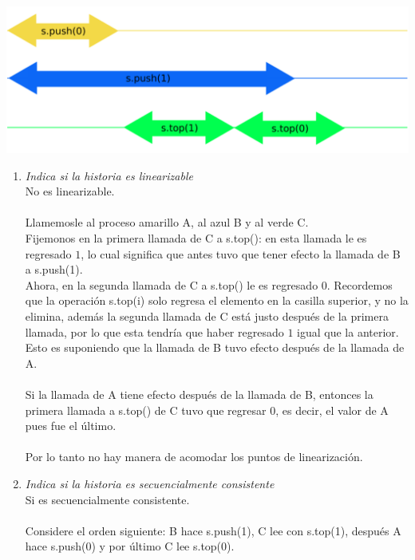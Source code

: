 \documentclass{article}
\begin{document}
\begin{enumerate}
{\begin{itemize}
{    \begin{centering}
      \includegraphics[scale=0.27]{figure1}
    \end{centering}
  }
\end{itemize}

\begin{enumerate}
  \item{\textsl{Indica si la historia es linearizable}}
  \\No es linearizable.
  \\\\Llamemosle al proceso amarillo A, al azul B y al verde C.
  \\Fijemonos en la primera llamada de C a s.top(): en esta llamada le
  es regresado $1$, lo cual significa que antes tuvo que tener efecto
  la llamada de B a s.push(1).
  \\Ahora, en la segunda llamada de C a s.top() le es regresado $0$.
  Recordemos que la operación s.top(i) solo regresa el elemento en la
  casilla superior, y no la elimina, además la segunda llamada de C está
  justo después de la primera llamada, por lo que esta tendría que haber
  regresado $1$ igual que la anterior.
  \\Esto es suponiendo que la llamada de B tuvo efecto después de la
  llamada de A.
  \\\\Si la llamada de A tiene efecto después de la llamada de B, entonces
  la primera llamada a s.top() de C tuvo que regresar 0, es decir, el valor
  de A pues fue el último.
  \\\\Por lo tanto no hay manera de acomodar los puntos de linearización.
  \item{\textsl{Indica si la historia es secuencialmente consistente}}
  \\Si es secuencialmente consistente.
  \\\\Considere el orden siguiente: B hace s.push(1), C lee con s.top(1),
  después A hace s.push(0) y por último C lee s.top(0).
\end{enumerate}

}
\end{enumerate}
\end{document}
